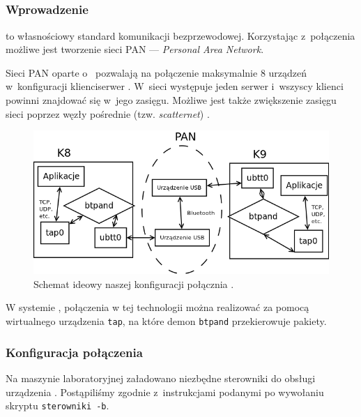 \subsection{\bt}
\label{sec:bt}

\subsubsection{Wprowadzenie}

\bt{} to własnościowy standard komunikacji bezprzewodowej. Korzystając
z~połączenia \bt{} możliwe jest tworzenie sieci PAN --- \emph{Personal Area
Network}.

Sieci PAN oparte o~\bt{} pozwalają na połączenie maksymalnie 8 urządzeń
w~konfiguracji klienci\dywiz serwer \cite{wiki:pan}. W~sieci występuje jeden
serwer i~wszyscy klienci powinni znajdować się w~jego zasięgu. Możliwe jest
także zwiększenie zasięgu sieci poprzez węzły pośrednie (tzw.
\emph{scatternet}) \cite{bt}.

\begin{figure}[h!]
  \centering
  \includegraphics[width=\textwidth]{figury/schemat-bluetooth.png}
  \caption{Schemat ideowy naszej konfiguracji połącznia \bt.}
\end{figure}

W systemie \bsd, połączenia w tej technologii można realizować za pomocą
wirtualnego urządzenia \texttt{tap}, na które demon \texttt{btpand}
przekierowuje pakiety.

\subsubsection{Konfiguracja połączenia}

Na maszynie laboratoryjnej załadowano niezbędne sterowniki do obsługi
urządzenia \bt. Postąpiliśmy zgodnie z~instrukcjami podanymi po wywołaniu
skryptu \texttt{sterowniki -b}.

